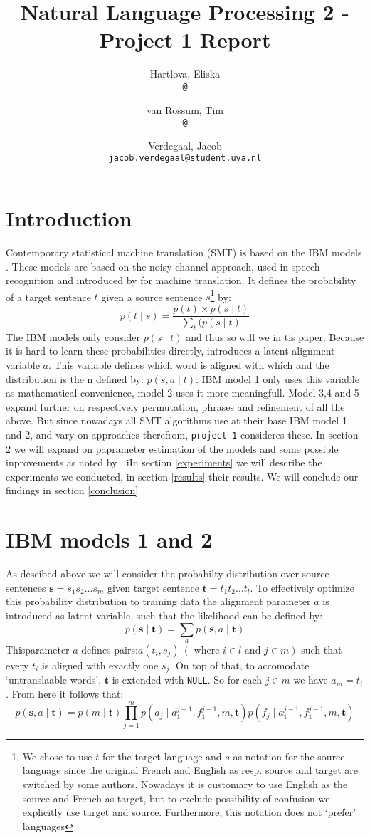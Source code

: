\documentclass[11pt,twocolumn,DIV=11]{scrartcl}
\title{\small Natural Language Processing 2 - Project 1 Report \LARGE \\ \sc{\bf{IBM Models 1 and 2}} }
\author{
    Hartlova, Eliska\\
    \texttt{@}
    \and
    van Rossum, Tim\\
    \texttt{@}
    \and
    Verdegaal, Jacob\\
    \texttt{jacob.verdegaal@student.uva.nl}
}
\renewcommand{\bf}[1]{\textbf{#1}}
\begin{document}
\maketitle


\section{Introduction}
Contemporary statistical machine translation (SMT) is based on the IBM models \citep{brown}. These models are based on the noisy channel approach, used in speech recognition and introduced by \citeauthor{weaver} for machine translation. It defines the probability of a target sentence $t$ given a source sentence $s$\footnote{We chose to use $t$ for the target language and $s$ as notation for the source language since the original French and English as resp. source and target are switched by some authors. Nowadays it is customary to use English as the source and French as target, but to exclude possibility of confusion we explicitly use target and source. Furthermore, this notation does not `prefer' languages} by:
\[p(t\mid s) = \frac{p(t)\times p(s\mid t)}{\sum_t(p(s\mid t)}\]
The IBM models only consider $p(s\mid t)$ and thus so will we in tis paper. Because it is hard to learn these probabilities directly, \citeauthor{brown} introduces a latent alignment variable $a$. This variable defines which word is aligned with which and the distribution is the n defined by: $p(s,a\mid t)$. IBM model 1 only uses this variable as mathematical convenience, model 2 uses it more meaningfull. Model 3,4 and 5 expand further on respectively permutation, phrases and refinement of all the above. But since nowadays all SMT algorithms use at their base IBM model 1 and 2, and vary on approaches therefrom, \texttt{project 1} consideres these.
In section \ref{models} we will expand on paprameter estimation of the models and some possible inprovements as noted by \citeauthor{moore}. iIn section \ref{experiments} we will describe the experiments we conducted, in section \ref{results} their results. We will conclude our findings in section \ref{conclusion}

\section{IBM models 1 and 2}
\label{models}
As descibed above we will consider the probabilty distribution over source sentences $\textbf{s} = s_1s_2\ldots s_m$ given target sentence $\textbf{t}= t_1t_2\ldots t_l$. To effectively optimize this probability distribution to training data the alignment parameter $a$ is introduced as latent variable, such that the likelihood can be defined by:
\[p(\bf{s}\mid \bf{t}) = \sum_ap(\bf{s},a\mid \bf{t})\]
Thisparameter $a$ defines pairs:$a(t_i,s_j)\ (\text{ where } i\in l \text{ and } j\in m)$ such that every $t_i$ is aligned with exactly one $s_j$. On top of that, to accomodate `untranslaable words', $\textbf{t}$ is extended with \texttt{NULL}. So for each $j\in m$ we have $a_m=t_i$. From here it follows that:
\[p(\bf{s},a\mid \bf{t} ) = p(m\mid \bf{t})\prod_{j=1}^mp(a_j\mid a_1^{j-1},f_1^{j-1},m,\bf{t})p(f_j\mid a_1^{j-1},f_1^{j-1},m,\bf{t})\]
\end{document}

